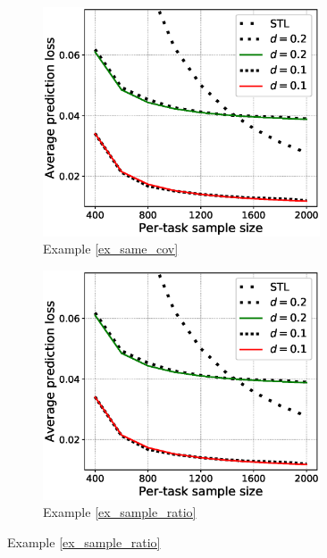 \iffalse
\begin{figure}[!t]
	\begin{subfigure}[b]{0.5\textwidth}
		\centering
		\includegraphics[width=0.9\textwidth]{figures/same_covariates.eps}
		\caption{Example \ref{ex_same_cov}}
		\label{fig_same_cov}
	\end{subfigure}\hfill
	\begin{subfigure}[b]{0.5\textwidth}
		\centering
		\includegraphics[width=0.9\textwidth]{figures/same_covariates.eps}
		\caption{Example \ref{ex_sample_ratio}}
		\label{fig_width}
	\end{subfigure}

\end{figure}
